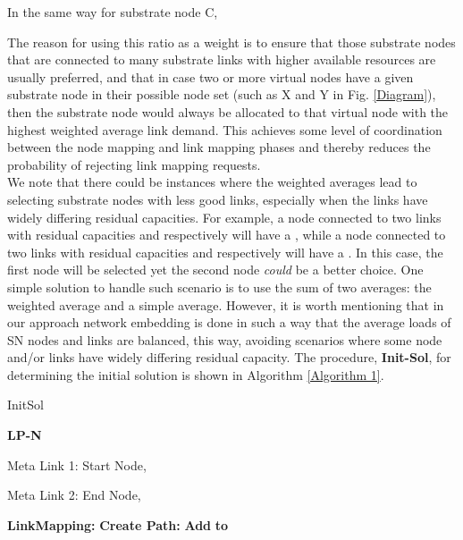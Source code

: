 \documentclass[journal]{IEEEtran}
\begin{document}
\endgroup
In the same way for substrate node C,
\begingroup
\fontsize{9pt}{9pt}

\endgroup
The reason for using this ratio as a weight is to ensure that those substrate nodes that are connected to many substrate links with higher available resources are usually preferred, and that in case two or more virtual nodes have a given substrate node in their possible node set (such as X and Y in Fig. \ref{Diagram}), then the substrate node would always be allocated to that virtual node with the highest weighted average link demand. This achieves some level of coordination between the node mapping and link mapping phases and thereby reduces the probability of rejecting link mapping requests.\\
\indent We note that there could be instances where the weighted averages lead to selecting substrate nodes with less good links, especially when the links have widely differing residual capacities. For example, a node connected to two links with residual capacities  and  respectively will have a , while a node connected to two links with residual capacities  and  respectively will have a . In this case, the first node will be selected yet the second node \emph{could} be a better choice. One simple solution to handle such scenario is to use the sum of two averages: the weighted average and a simple average. However, it is worth mentioning that in our approach network embedding is done in such a way that the average loads of \ac{SN} nodes and links are balanced, this way, avoiding scenarios where some node and/or links have widely differing residual capacity. The procedure, \textbf{Init-Sol}, for determining the initial solution is shown in Algorithm \ref{Algorithm 1}.

\begin{algorithm}[t]
\caption{InitSol }
\label{Algorithm 1}
\begin{algorithmic}[1]
\FOR{}
\STATE 
\IF{}
\STATE 
\STATE 
\ENDIF
\STATE 
\ENDFOR
\FOR{}
\STATE 
\ENDFOR
\STATE  \textbf{LP-N}


\FOR{}

\FOR{}

\IF{}

\STATE Meta Link 1: 
\STATE Start Node, 

\ENDIF

\ENDFOR

\FOR{}

\IF{}

\STATE Meta Link 2: 
\STATE End Node, 

\ENDIF

\ENDFOR

\STATE \textbf{LinkMapping:} 
\STATE \textbf{Create Path:} 
\STATE \textbf{Add }  \textbf{ to } 

\ENDFOR
\end{algorithmic}
\end{algorithm}
\end{document}
